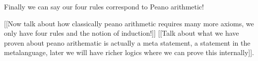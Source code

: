 Finally we can say our four rules correspond to Peano arithmetic!

[[Now talk about how classically peano arithmetic requires many more axioms, we only have four rules and the notion of induction!]]
[[Talk about what we have proven about peano arithematic is actually a meta statement, a statement in the metalanguage, later we will have richer logics where we can prove this internally]].



